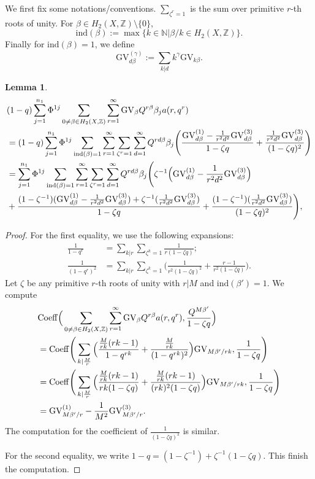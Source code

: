 \documentclass[11pt]{amsart}
\newtheorem{lemma}[theorem]{Lemma}
\newtheorem*{main theorem*}{Main Theorem}
\theoremstyle{remark}
\numberwithin{equation}{section}
\newcommand{\Coeff}{{\rm Coeff}}
\newcommand{\GV}{{\mathrm{GV}}}
\newcommand{\ind}{{\mathrm{ind}}}
\begin{document}
We first fix some notations/conventions. $\sum_{\zeta^r=1}$ is the sum over primitive $r$-th roots of unity. For $\beta\in H_2(X,\mathbb{Z}) \setminus \{0\}$, 
\[
    \ind(\beta) := \max \Big\{ k\in \mathbb{N} \Big| \beta/k \in H_2(X,\mathbb{Z}) \Big\}.
\]
Finally for $\ind (\beta)=1$, we define
\[
    \GV_{d\beta}^{(\gamma)} := \sum_{k|d} k^{\gamma} \GV_{k\beta}.
\]
\begin{lemma} \label{lemma_a_expansion}
\[
\begin{split}
    &(1-q)\sum_{j=1}^{n_1}\Phi^{1j}\sum_{0\neq \beta\in H_2(X,\mathbb{Z})} \sum_{r=1}^{\infty} \GV_{\beta} Q^{r\beta} \beta_j a(r,q^r)
    \\
    & =(1-q)\sum_{j=1}^{n_1}\Phi^{1j}\sum_{{\rm ind}(\beta)=1} \sum_{r=1}^{\infty} \sum_{\zeta^r=1} \sum_{d=1}^{\infty}Q^{rd\beta} \beta_j \Bigg( \frac{\GV_{d\beta}^{(1)} - \frac{1}{r^2d^2} \GV_{d\beta}^{(3)} }{1-\zeta q} + \frac{\frac{1}{r^2d^2}\GV_{d\beta}^{(3)} }{(1-\zeta q)^2} \Bigg)
    \\
    & = \sum_{j=1}^{n_1}\Phi^{1j}\sum_{{\rm ind}(\beta)=1} \sum_{r=1}^{\infty} \sum_{\zeta^r=1} \sum_{d=1}^{\infty}Q^{rd\beta} \beta_j \Bigg( \zeta^{-1} \Big( \GV_{d\beta}^{(1)} - \frac{1}{r^2d^2} \GV_{d\beta}^{(3)} \Big)
    \\
    & + \frac{(1-\zeta^{-1})(\GV_{d\beta}^{(1)} - \frac{1}{r^2d^2} \GV_{d\beta}^{(3)}) + \zeta^{-1}(\frac{1}{r^2d^2}\GV_{d\beta}^{(3)}) }{1-\zeta q} + \frac{ (1-\zeta^{-1})(\frac{1}{r^2d^2} \GV_{d\beta}^{(3)} ) }{(1-\zeta q)^2}\Bigg),
\end{split}
\]
\end{lemma}
\begin{proof}
For the first equality, we use the following expansions:
\[
\begin{split}
    \frac{1}{1-q^r} &= \sum_{k|r}\sum_{\zeta^k=1} \frac{1}{r(1-\zeta q)};
    \\
    \frac{1}{(1-q^r)^2} &= \sum_{k|r}\sum_{\zeta^k=1} \Big( \frac{1}{r^2(1-\zeta q)^2} + \frac{r-1}{r^2(1-\zeta q)} \Big).
\end{split}
\]
Let $\zeta$ be any primitive $r$-th roots of unity with $r|M$ and $\ind(\beta')=1$. We compute
\[
\begin{split}
    &\Coeff\Big(\sum_{0\neq \beta\in H_2(X,\mathbb{Z})} \sum_{r=1}^{\infty} \GV_{\beta} Q^{r\beta} a(r,q^r), \frac{Q^{M\beta'}}{1-\zeta q} \Big)
    \\
    & =\Coeff \Bigg(  \sum_{k| \frac{M}{r}}\Big( \frac{ \frac{M}{rk}(rk-1) }{1-q^{rk}} + \frac{ \frac{M}{rk} }{(1-q^{rk})^2} \Big) \GV_{M\beta' /rk} ,  \frac{1}{1-\zeta q}  \Bigg)
    \\
    & = \Coeff \Bigg( \sum_{k|\frac{M}{r}} \Big( \frac{\frac{M}{rk}(rk-1)}{rk(1-\zeta q)} + \frac{\frac{M}{rk}(rk-1)}{(rk)^2(1-\zeta q)} \Big)\GV_{M\beta'/rk}, \frac{1}{1-\zeta q}   \Bigg)
    \\
    & = \GV_{M\beta'/r}^{(1)} - \frac{1}{M^2} \GV_{M\beta'/r}^{(3)}.
\end{split}
\]
The computation for the coefficient of $\frac{1}{(1-\zeta q)^2}$ is similar. 

For the second equality, we write $1-q = (1-\zeta^{-1}) + \zeta^{-1}(1-\zeta q)$. This finish the computation.
\end{proof}
\end{document}

